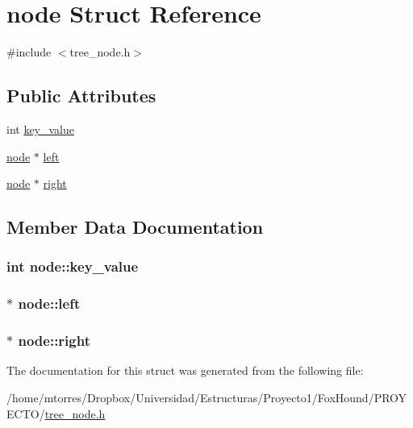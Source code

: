 \hypertarget{structnode}{\section{node Struct Reference}
\label{structnode}
}


{\ttfamily \#include $<$tree\-\_\-node.\-h$>$}

\subsection*{Public Attributes}
\begin{DoxyCompactItemize}
\item 
int \hyperlink{structnode_a182db137ea0884489bee856c63b33d9a}{key\-\_\-value}
\item 
\hyperlink{structnode}{node} $\ast$ \hyperlink{structnode_a7cbff55ff448f557223f79299056e9b1}{left}
\item 
\hyperlink{structnode}{node} $\ast$ \hyperlink{structnode_abdc86d4c8604c481752953af3235fc47}{right}
\end{DoxyCompactItemize}


\subsection{Member Data Documentation}
\hypertarget{structnode_a182db137ea0884489bee856c63b33d9a}{
\subsubsection[{key\-\_\-value}]{\setlength{\rightskip}{0pt plus 5cm}int node\-::key\-\_\-value}}\label{structnode_a182db137ea0884489bee856c63b33d9a}
\hypertarget{structnode_a7cbff55ff448f557223f79299056e9b1}{
\subsubsection[{left}]{$\ast$ node\-::left}}\label{structnode_a7cbff55ff448f557223f79299056e9b1}
\hypertarget{structnode_abdc86d4c8604c481752953af3235fc47}{
\subsubsection[{right}]{$\ast$ node\-::right}}\label{structnode_abdc86d4c8604c481752953af3235fc47}


The documentation for this struct was generated from the following file\-:\begin{DoxyCompactItemize}
\item 
/home/mtorres/\-Dropbox/\-Universidad/\-Estructuras/\-Proyecto1/\-Fox\-Hound/\-P\-R\-O\-Y\-E\-C\-T\-O/\hyperlink{tree__node_8h}{tree\-\_\-node.\-h}\end{DoxyCompactItemize}

